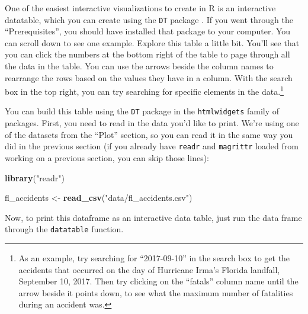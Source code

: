 \documentclass[]{tufte-book}
\newenvironment{Shaded}{}{}
\newcommand{\KeywordTok}[1]{\textcolor[rgb]{0.00,0.44,0.13}{\textbf{#1}}}
\newcommand{\NormalTok}[1]{#1}
\newcommand{\OperatorTok}[1]{\textcolor[rgb]{0.40,0.40,0.40}{#1}}
\newcommand{\StringTok}[1]{\textcolor[rgb]{0.25,0.44,0.63}{#1}}
\begin{document}
One of the easiest interactive visualizations to create in R is an interactive datatable,
which you can create using the \texttt{DT} package \citep{R-DT}.
If you went through the ``Prerequisites'', you should have installed that package to your
computer.
You can scroll down to see one example. Explore this table a little bit. You'll
see that you can click the numbers at the bottom right of the table to page through all
the data in the table. You can use the arrows beside the column names to rearrange
the rows based on the values they have in a column. With the search box in the top right,
you can try searching for specific elements in the data.\footnote{As an example, try searching for
  ``2017-09-10'' in the search box to get the accidents that occurred on the day of Hurricane
  Irma's Florida landfall, September 10, 2017. Then try clicking on the ``fatals'' column
  name until the arrow beside it points down, to see what the maximum number of fatalities
  during an accident was.}

You can build this table using the \texttt{DT} package in the \texttt{htmlwidgets} family of packages.
First, you need to read in the data you'd like to print. We're using one of the datasets
from the ``Plot'' section, so you can read it in the same way you did in the previous section
(if you already have \texttt{readr} and \texttt{magrittr} loaded from working on a previous section,
you can skip those lines):

\begin{Shaded}
\begin{Highlighting}[]
\KeywordTok{library}\NormalTok{(}\StringTok{"readr"}\NormalTok{)}

\NormalTok{fl_accidents <-}\StringTok{ }\KeywordTok{read_csv}\NormalTok{(}\StringTok{"data/fl_accidents.csv"}\NormalTok{)}
\end{Highlighting}
\end{Shaded}

Now, to print this dataframe as an interactive data table, just run the data frame through
the \texttt{datatable} function.

\begin{Shaded}
\end{Shaded}
\end{document}
